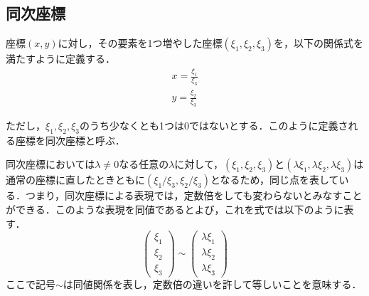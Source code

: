 \documentclass[openright]{nitocs}
\numberwithin{equation}{section}
\begin{document}
        \subsection{同次座標}
            座標$(x,y)$に対し，その要素を1つ増やした座標$(\xi_1,\xi_2,\xi_3)$を，以下の関係式を満たすように定義する．\\
            \begin{equation} %
                \begin{split} %
                    x = \frac{\xi_1}{\xi_3} \\ 
                    y = \frac{\xi_2}{\xi_3}
                \end{split}
                \label{Homogeneous}
            \end{equation}

            ただし，$\xi_1,\xi_2,\xi_3$のうち少なくとも1つは0ではないとする．このように定義される座標を同次座標と呼ぶ\cite{DIP}．

            同次座標においては$\lambda\neq0$なる任意の$\lambda$に対して，$(\xi_1,\xi_2,\xi_3)$と$(\lambda\xi_1,\lambda\xi_2,\lambda\xi_3)$は通常の座標に直したときともに$(\xi_1/\xi_3,\xi_2/\xi_3)$となるため，同じ点を表している．つまり，同次座標による表現では，定数倍をしても変わらないとみなすことができる．このような表現を同値であるとよび，これを式では以下のように表す．
            \begin{equation} %
                \left(
                    \begin{array}{ccc}
                        \xi_1\\
                        \xi_2\\
                        \xi_3
                    \end{array}
                \right) \sim %
                \left(
                    \begin{array}{ccc}
                        \lambda\xi_1\\
                        \lambda\xi_2\\
                        \lambda\xi_3
                    \end{array}
                \right)
            \end{equation}
            ここで記号$\sim$は同値関係を表し，定数倍の違いを許して等しいことを意味する．

\end{document}
